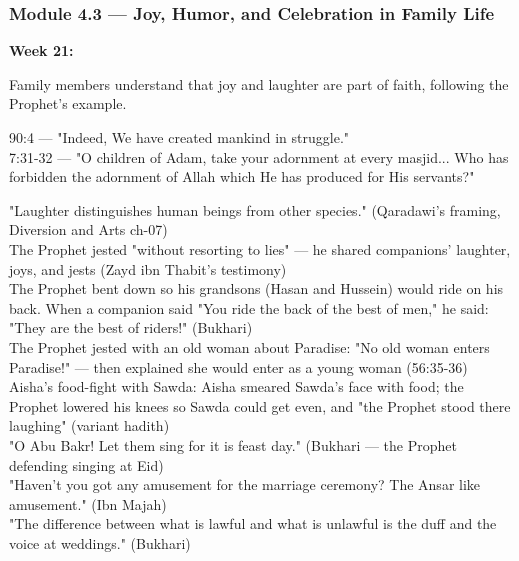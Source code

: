 \documentclass[11pt,a4paper]{article}
\begin{document}
\subsubsection*{Module 4.3 --- Joy, Humor, and Celebration in Family Life}
\textbf{Week 21:} 

\begin{outcomebox} Family members understand that joy and laughter are part of faith, following the Prophet's example. \end{outcomebox}

\begin{quranbox} 90:4 --- "Indeed, We have created mankind in struggle." \\ 7:31-32 --- "O children of Adam, take your adornment at every masjid... Who has forbidden the adornment of Allah which He has produced for His servants?" \end{quranbox}

\begin{hadithbox} "Laughter distinguishes human beings from other species." (Qaradawi's framing, Diversion and Arts ch-07) \\ The Prophet jested "without resorting to lies" --- he shared companions' laughter, joys, and jests (Zayd ibn Thabit's testimony) \\ The Prophet bent down so his grandsons (Hasan and Hussein) would ride on his back. When a companion said "You ride the back of the best of men," he said: "They are the best of riders!" (Bukhari) \\ The Prophet jested with an old woman about Paradise: "No old woman enters Paradise!" --- then explained she would enter as a young woman (56:35-36) \\ Aisha's food-fight with Sawda: Aisha smeared Sawda's face with food; the Prophet lowered his knees so Sawda could get even, and "the Prophet stood there laughing" (variant hadith) \\ "O Abu Bakr! Let them sing for it is feast day." (Bukhari --- the Prophet defending singing at Eid) \\ "Haven't you got any amusement for the marriage ceremony? The Ansar like amusement." (Ibn Majah) \\ "The difference between what is lawful and what is unlawful is the duff and the voice at weddings." (Bukhari) \end{hadithbox}
\end{document}
